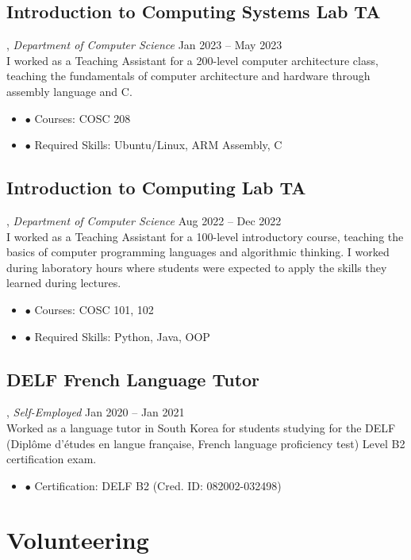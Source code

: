 \documentclass[11pt, letterpaper]{article}
\newenvironment{nitemize}{%
  \begin{itemize}[label={},topsep=0pt,itemsep=0pt,parsep=0pt,leftmargin=*]%
}{%
  \end{itemize}%
}
\begin{document}
\subsection{Introduction to Computing Systems Lab TA}, \emph{Department of Computer Science} \hfill Jan 2023 – May 2023\\
I worked as a Teaching Assistant for a 200-level computer architecture class, teaching the fundamentals of computer architecture and hardware through assembly language and C.
\begin{nitemize}
    \item \(\bullet\) Courses: COSC 208
    \item \(\bullet\) Required Skills: Ubuntu/Linux, ARM Assembly, C
\end{nitemize}
\subsection{Introduction to Computing Lab TA}, \emph{Department of Computer Science} \hfill Aug 2022 – Dec 2022\\
I worked as a Teaching Assistant for a 100-level introductory course, teaching the basics of computer programming languages and algorithmic thinking. I worked during laboratory hours where students were expected to apply the skills they learned during lectures.
\begin{nitemize}
    \item \(\bullet\) Courses: COSC 101, 102
    \item \(\bullet\) Required Skills: Python, Java, OOP
\end{nitemize}

\subsection{DELF French Language Tutor}, \emph{Self-Employed} \hfill Jan 2020 – Jan 2021\\
Worked as a language tutor in South Korea for students studying for the DELF (Diplôme d’études en langue française, French language proficiency test) Level B2 certification exam.
\begin{nitemize}
    \item \(\bullet\) Certification: DELF B2 (Cred. ID: 082002-032498)
\end{nitemize}

\section{Volunteering}
\end{document}

